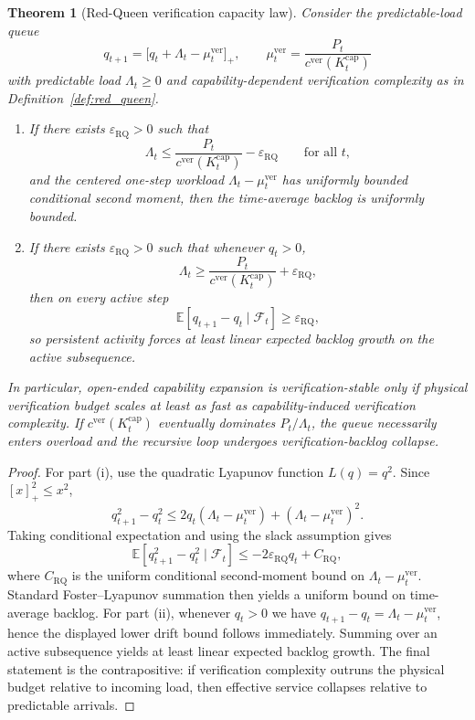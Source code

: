 \documentclass[11pt]{article}
\newtheorem{theorem}{Theorem}[section]
\theoremstyle{definition}
\newcommand{\E}{\mathbb{E}}
\newcommand{\1}{\mathbf{1}}
\newcommand{\eps}{\varepsilon}
\begin{document}
\begin{theorem}[Red-Queen verification capacity law]\label{thm:red_queen}
Consider the predictable-load queue
\[
q_{t+1}=\bigl[q_t+\Lambda_t-\mu_t^{\mathrm{ver}}\bigr]_+,
\qquad
\mu_t^{\mathrm{ver}}=\frac{P_t}{c^{\mathrm{ver}}(K_t^{\mathrm{cap}})}
\]
with predictable load $\Lambda_t\ge 0$ and capability-dependent verification complexity as in Definition~\ref{def:red_queen}.
\begin{enumerate}[label=(\roman*), leftmargin=2em]
  \item If there exists $\eps_{\mathrm{RQ}}>0$ such that
  \[
  \Lambda_t\le \frac{P_t}{c^{\mathrm{ver}}(K_t^{\mathrm{cap}})}-\eps_{\mathrm{RQ}}
  \qquad\text{for all }t,
  \]
  and the centered one-step workload $\Lambda_t-\mu_t^{\mathrm{ver}}$ has uniformly bounded conditional second moment, then the time-average backlog is uniformly bounded.
  \item If there exists $\eps_{\mathrm{RQ}}>0$ such that whenever $q_t>0$,
  \[
  \Lambda_t\ge \frac{P_t}{c^{\mathrm{ver}}(K_t^{\mathrm{cap}})}+\eps_{\mathrm{RQ}},
  \]
  then on every active step
  \[
  \E[q_{t+1}-q_t\mid\mathcal F_t]\ge \eps_{\mathrm{RQ}},
  \]
  so persistent activity forces at least linear expected backlog growth on the active subsequence.
\end{enumerate}
In particular, open-ended capability expansion is verification-stable only if physical verification budget scales at least as fast as capability-induced verification complexity. If $c^{\mathrm{ver}}(K_t^{\mathrm{cap}})$ eventually dominates $P_t/\Lambda_t$, the queue necessarily enters overload and the recursive loop undergoes verification-backlog collapse.
\end{theorem}

\begin{proof}
For part (i), use the quadratic Lyapunov function $L(q)=q^2$. Since $[x]_+^2\le x^2$,
\[
q_{t+1}^2-q_t^2
\le
2q_t(\Lambda_t-\mu_t^{\mathrm{ver}})+(\Lambda_t-\mu_t^{\mathrm{ver}})^2.
\]
Taking conditional expectation and using the slack assumption gives
\[
\E[q_{t+1}^2-q_t^2\mid\mathcal F_t]
\le
-2\eps_{\mathrm{RQ}}q_t + C_{\mathrm{RQ}},
\]
where $C_{\mathrm{RQ}}$ is the uniform conditional second-moment bound on $\Lambda_t-\mu_t^{\mathrm{ver}}$. Standard Foster--Lyapunov summation then yields a uniform bound on time-average backlog. For part (ii), whenever $q_t>0$ we have $q_{t+1}-q_t=\Lambda_t-\mu_t^{\mathrm{ver}}$, hence the displayed lower drift bound follows immediately. Summing over an active subsequence yields at least linear expected backlog growth. The final statement is the contrapositive: if verification complexity outruns the physical budget relative to incoming load, then effective service collapses relative to predictable arrivals.
\end{proof}
\end{document}
